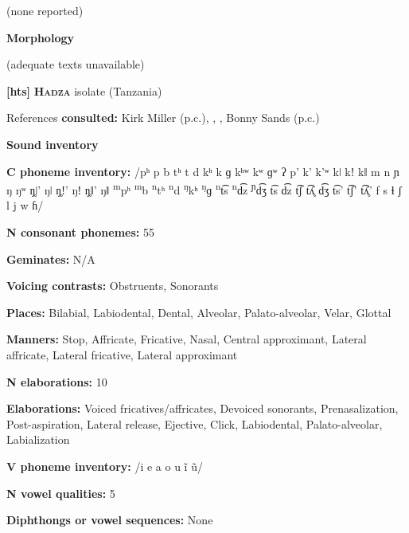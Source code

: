 (none reported)



\textbf{Morphology}



(adequate texts unavailable)



\textbf{[hts]}   \textbf{\textsc{Hadza}}  isolate (Tanzania)



References \textbf{consulted:} Kirk Miller (p.c.), \citet{Sands2013}, \citet{SandsEtAl2012}, Bonny Sands (p.c.)



\textbf{Sound inventory}



\textbf{C phoneme inventory:} /pʰ p b tʰ t d kʰ k ɡ kʰʷ kʷ ɡʷ ʔ p’ k’ k’ʷ kǀ kǃ kǁ m n ɲ ŋ ŋʷ ŋ̥ǀ’ ŋǀ ŋ̥ǃ’ ŋǃ ŋ̥ǁ’ ŋǁ \textsuperscript{m}pʰ \textsuperscript{m}b \textsuperscript{n}tʰ \textsuperscript{n}d \textsuperscript{ŋ}kʰ \textsuperscript{ŋ}ɡ \textsuperscript{n}t͡s \textsuperscript{n}d͡z \textsuperscript{ɲ}d͡ʒ t͡s d͡z t͡ʃ t͡ʎ̥ d͡ʒ t͡s’ t͡ʃ’ t͡ʎ̥’ f s ɬ ʃ l j w ɦ/



\textbf{N consonant phonemes:} 55



\textbf{Geminates:} N/A



\textbf{Voicing contrasts:} Obstruents, Sonorants



\textbf{Places:} Bilabial, Labiodental, Dental, Alveolar, Palato-alveolar, Velar, Glottal



\textbf{Manners:} Stop, Affricate, Fricative, Nasal, Central approximant, Lateral affricate, Lateral fricative, Lateral approximant



\textbf{N elaborations:} 10



\textbf{Elaborations:} Voiced fricatives/affricates, Devoiced sonorants, Prenasalization, Post-aspiration, Lateral release, Ejective, Click, Labiodental, Palato-alveolar, Labialization



\textbf{V phoneme inventory:} /i e a o u ĩ ũ/



\textbf{N vowel qualities:} 5



\textbf{Diphthongs or vowel sequences:} None



